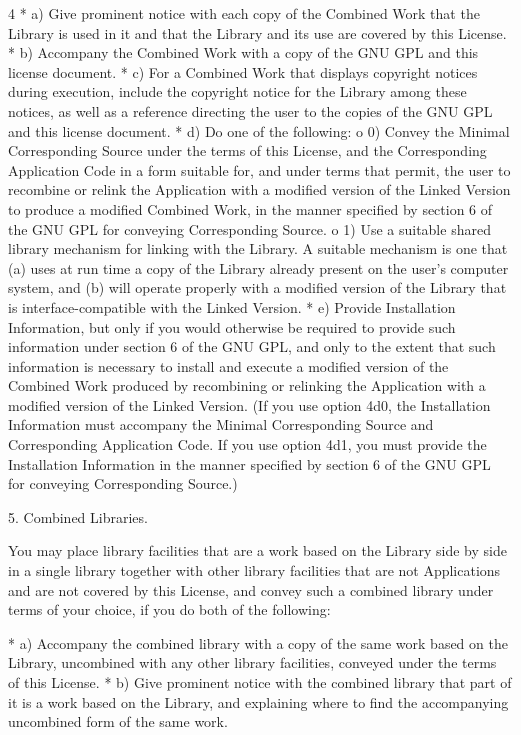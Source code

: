 \documentclass[fontsize=11pt,paper=A4,BCOR=12mm,DIV=13,open=any,listof=totoc,toc=flat]{scrbook}
\begin{document}
{\begin{multicols}{4}
    * a) Give prominent notice with each copy of the Combined Work that the Library is used in it and that the Library and its use are covered by this License.
    * b) Accompany the Combined Work with a copy of the GNU GPL and this license document.
    * c) For a Combined Work that displays copyright notices during execution, include the copyright notice for the Library among these notices, as well as a reference directing the user to the copies of the GNU GPL and this license document.
    * d) Do one of the following:
          o 0) Convey the Minimal Corresponding Source under the terms of this License, and the Corresponding Application Code in a form suitable for, and under terms that permit, the user to recombine or relink the Application with a modified version of the Linked Version to produce a modified Combined Work, in the manner specified by section 6 of the GNU GPL for conveying Corresponding Source.
          o 1) Use a suitable shared library mechanism for linking with the Library. A suitable mechanism is one that (a) uses at run time a copy of the Library already present on the user's computer system, and (b) will operate properly with a modified version of the Library that is interface-compatible with the Linked Version.
    * e) Provide Installation Information, but only if you would otherwise be required to provide such information under section 6 of the GNU GPL, and only to the extent that such information is necessary to install and execute a modified version of the Combined Work produced by recombining or relinking the Application with a modified version of the Linked Version. (If you use option 4d0, the Installation Information must accompany the Minimal Corresponding Source and Corresponding Application Code. If you use option 4d1, you must provide the Installation Information in the manner specified by section 6 of the GNU GPL for conveying Corresponding Source.)

5. Combined Libraries.

You may place library facilities that are a work based on the Library side by side in a single library together with other library facilities that are not Applications and are not covered by this License, and convey such a combined library under terms of your choice, if you do both of the following:

    * a) Accompany the combined library with a copy of the same work based on the Library, uncombined with any other library facilities, conveyed under the terms of this License.
    * b) Give prominent notice with the combined library that part of it is a work based on the Library, and explaining where to find the accompanying uncombined form of the same work.


\end{multicols}}
\end{document}
